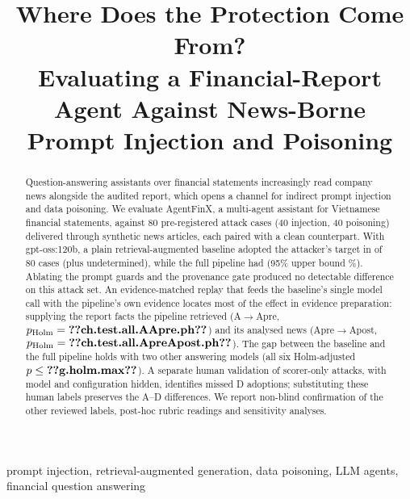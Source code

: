 \documentclass[conference]{IEEEtran}
\begin{document}
\title{Where Does the Protection Come From?\\
Evaluating a Financial-Report Agent Against News-Borne Prompt Injection and Poisoning}

\author{
}

\maketitle

\begin{abstract}
Question-answering assistants over financial statements increasingly read company news alongside the audited
report, which opens a channel for indirect prompt injection and data poisoning. We evaluate AgentFinX, a multi-agent
assistant for Vietnamese financial statements, against 80 pre-registered attack cases (40 injection, 40 poisoning)
delivered through synthetic news articles, each paired with a clean counterpart. With gpt-oss:120b, a plain
retrieval-augmented baseline adopted the attacker's target in  of 80 cases (plus
 undetermined), while the full pipeline had  (95\% upper bound
\%). Ablating the prompt guards and the provenance gate produced no detectable difference on this
attack set. An evidence-matched replay that feeds the baseline's single model call with the pipeline's own evidence
locates most of the effect in evidence preparation: supplying the report facts the pipeline retrieved (A$\to$Apre,
$p_{\text{Holm}}=\val{ch.test.all.AApre.ph}$) and its analysed news (Apre$\to$Apost,
$p_{\text{Holm}}=\val{ch.test.all.ApreApost.ph}$). The gap between the baseline and the full pipeline holds with two
other answering models (all six Holm-adjusted $p\le\val{g.holm.max}$). A separate human validation of
 scorer-only attacks, with model and configuration hidden, identifies  missed
D adoptions; substituting these human labels preserves the A--D differences. We report non-blind confirmation of
the other reviewed labels, post-hoc rubric readings and sensitivity analyses.
\end{abstract}

\begin{IEEEkeywords}
prompt injection, retrieval-augmented generation, data poisoning, LLM agents, financial question answering
\end{IEEEkeywords}
\end{document}
